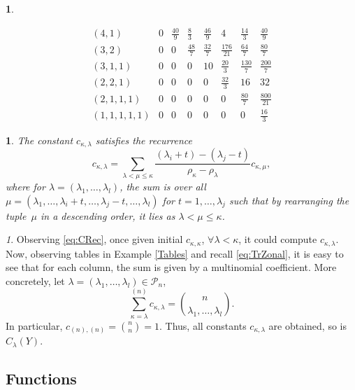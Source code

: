 \documentclass[10pt,oneside,american]{amsart}
\numberwithin{equation}{section}
\numberwithin{figure}{section}
\theoremstyle{definition}
\theoremstyle{remark}
\newtheorem{rem}{\protect\remarkname}[section]
\theoremstyle{plain}
\theoremstyle{definition}
\newtheorem{example}{\protect\examplename}[section]
\theoremstyle{plain}
\newtheorem{thm}{\protect\theoremname}[section]
\theoremstyle{plain}
\theoremstyle{plain}
\providecommand{\examplename}{Example}
\providecommand{\remarkname}{Remark}
\providecommand{\theoremname}{Theorem}
\begin{document}
\begin{example}
\begin{itemize}
\[\begin{array}{c|ccccccc}
\left(4,1\right) & 0 & \frac{40}{9} & \frac{8}{3} & \frac{46}{9} & 4 & \frac{14}{3} & \frac{40}{9}\\
\left(3,2\right) & 0 & 0 & \frac{48}{7} & \frac{32}{7} & \frac{176}{21} & \frac{64}{7} & \frac{80}{7}\\
\left(3,1,1\right) & 0 & 0 & 0 & 10 & \frac{20}{3} & \frac{130}{7} & \frac{200}{7}\\
\left(2,2,1\right) & 0 & 0 & 0 & 0 & \frac{32}{3} & 16 & 32\\
\left(2,1,1,1\right) & 0 & 0 & 0 & 0 & 0 & \frac{80}{7} & \frac{800}{21}\\
\left(1,1,1,1,1\right) & 0 & 0 & 0 & 0 & 0 & 0 & \frac{16}{3}
\end{array}
\]
\end{itemize}
\end{example}
\begin{thm}
The constant $c_{\kappa,\lambda}$ satisfies the recurrence \cite[pp.~234, eq.~14]{Muirhead}
\begin{equation}
c_{\kappa,\lambda}=\sum_{\lambda<\mu\leq\kappa}\frac{\left(\lambda_{i}+t\right)-\left(\lambda_{j}-t\right)}{\rho_{\kappa}-\rho_{\lambda}}c_{\kappa,\mu},\label{eq:CRec}
\end{equation}
where for $\lambda=\left(\lambda_{1},\ldots,\lambda_{l}\right)$,
the sum is over all $\mu=\left(\lambda_{1},\ldots,\lambda_{i}+t,\ldots,\lambda_{j}-t,\ldots,\lambda_{l}\right)$
for $t=1,\ldots,\lambda_{j}$ such that by rearranging the tuple~$\mu$
in a descending order, it lies as $\lambda<\mu\leq\kappa$.
\end{thm}
\begin{rem}
Observing \eqref{eq:CRec}, once given initial $c_{\kappa,\kappa}$,
$\forall\lambda<\kappa$, it could compute $c_{\kappa,\lambda}$.
Now, observing tables in Example \ref{Tables} and recall \eqref{eq:TrZonal},
it is easy to see that for each column, the sum is given by a multinomial
coefficient. More concretely, let $\lambda=\left(\lambda_{1},\ldots,\lambda_{l}\right)\in\mathcal{P}_{n}$,
\begin{equation}
  \sum_{\kappa=\lambda}^{\left(n\right)}c_{\kappa,\lambda}=\binom{n}{\lambda_{1},\ldots,\lambda_{l}}.\label{eq:CInitial}
\end{equation}
In particular, $c_{\left(n\right),\left(n\right)}=\binom{n}{n}=1$.
Thus, all constants $c_{\kappa,\lambda}$ are obtained, so is $C_{\lambda}(Y)$. 
\end{rem}

\subsection{Functions}
\end{document}
